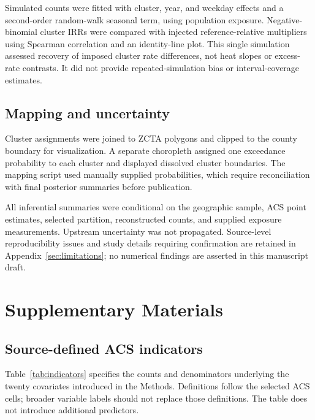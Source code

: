\documentclass[11pt,letterpaper]{article}
\begin{document}
Simulated counts were fitted with cluster, year, and weekday effects and a second-order random-walk seasonal term, using population exposure. Negative-binomial cluster IRRs were compared with injected reference-relative multipliers using Spearman correlation and an identity-line plot. This single simulation assessed recovery of imposed cluster rate differences, not heat slopes or excess-rate contrasts. It did not provide repeated-simulation bias or interval-coverage estimates.

\subsection{Mapping and uncertainty}
Cluster assignments were joined to ZCTA polygons and clipped to the county boundary for visualization. A separate choropleth assigned one exceedance probability to each cluster and displayed dissolved cluster boundaries. The mapping script used manually supplied probabilities, which require reconciliation with final posterior summaries before publication.

All inferential summaries were conditional on the geographic sample, ACS point estimates, selected partition, reconstructed counts, and supplied exposure measurements. Upstream uncertainty was not propagated. Source-level reproducibility issues and study details requiring confirmation are retained in Appendix~\ref{sec:limitations}; no numerical findings are asserted in this manuscript draft.

\clearpage

\appendix
\section{Supplementary Materials}
\label{sec:supplement}
\renewcommand{\thetable}{S\arabic{table}}
\setcounter{table}{0}

\subsection{Source-defined ACS indicators}
\label{supp:indicators}
Table~\ref{tab:indicators} specifies the counts and denominators underlying the twenty covariates introduced in the Methods. Definitions follow the selected ACS cells; broader variable labels should not replace those definitions. The table does not introduce additional predictors.
\end{document}
